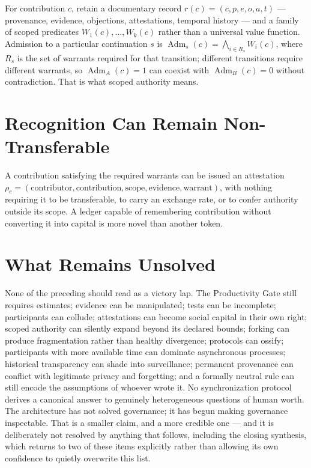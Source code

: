 \documentclass[12pt]{article}
\begin{document}
For contribution $c$, retain a documentary record $r(c)=(c,p,e,o,a,t)$ — provenance, evidence, objections, attestations, temporal history — and a family of scoped predicates $W_1(c),\dots,W_k(c)$ rather than a universal value function. Admission to a particular continuation $s$ is $\operatorname{Adm}_s(c)=\bigwedge_{i\in R_s}W_i(c)$, where $R_s$ is the set of warrants required for that transition; different transitions require different warrants, so $\operatorname{Adm}_A(c)=1$ can coexist with $\operatorname{Adm}_B(c)=0$ without contradiction. That is what scoped authority means.

\section{Recognition Can Remain Non-Transferable}

A contribution satisfying the required warrants can be issued an attestation $\rho_c=(\text{contributor},\text{contribution},\text{scope},\text{evidence},\text{warrant})$, with nothing requiring it to be transferable, to carry an exchange rate, or to confer authority outside its scope. A ledger capable of remembering contribution without converting it into capital is more novel than another token.

\section{What Remains Unsolved}

None of the preceding should read as a victory lap. The Productivity Gate still requires estimates; evidence can be manipulated; tests can be incomplete; participants can collude; attestations can become social capital in their own right; scoped authority can silently expand beyond its declared bounds; forking can produce fragmentation rather than healthy divergence; protocols can ossify; participants with more available time can dominate asynchronous processes; historical transparency can shade into surveillance; permanent provenance can conflict with legitimate privacy and forgetting; and a formally neutral rule can still encode the assumptions of whoever wrote it. No synchronization protocol derives a canonical answer to genuinely heterogeneous questions of human worth. The architecture has not solved governance; it has begun making governance inspectable. That is a smaller claim, and a more credible one — and it is deliberately not resolved by anything that follows, including the closing synthesis, which returns to two of these items explicitly rather than allowing its own confidence to quietly overwrite this list.
\end{document}
